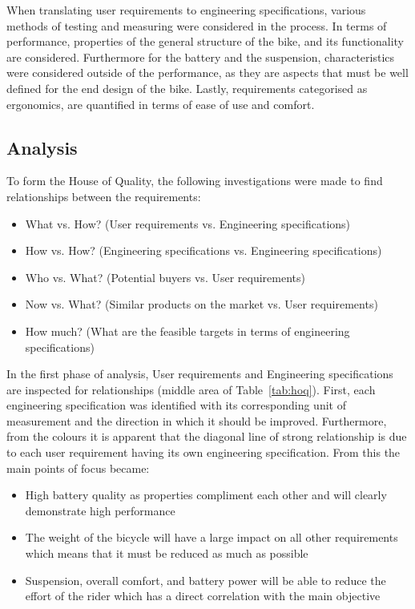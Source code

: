 \documentclass[a4paper,11pt]{article}
\begin{document}
When translating user requirements to engineering specifications, various methods of testing and measuring were considered in the process. In terms of performance, properties of the general structure of the bike, and its functionality are considered. Furthermore for the battery and the suspension, characteristics were considered outside of the performance, as they are aspects that must be well defined for the end design of the bike. Lastly, requirements categorised as ergonomics, are quantified in terms of ease of use and comfort.

\subsection{Analysis}

To form the House of Quality, the following investigations were made to find relationships between the requirements:
\begin{itemize}
	\setlength{\itemsep}{0pt}
	\item What vs. How? (User requirements vs. Engineering specifications)
	\item How vs. How? (Engineering specifications vs. Engineering specifications)
	\item Who vs. What? (Potential buyers vs. User requirements)
	\item Now vs. What? (Similar products on the market vs. User requirements)
	\item How much? (What are the feasible targets in terms of engineering specifications)
\end{itemize}

In the first phase of analysis, User requirements and Engineering specifications are inspected for relationships (middle area of Table~\ref{tab:hoq}). First, each engineering specification was identified with its corresponding unit of measurement and the direction in which it should be improved. Furthermore, from the colours it is apparent that the diagonal line of strong relationship is due to each user requirement having its own engineering specification. From this the main points of focus became:
\begin{itemize}
	\setlength{\itemsep}{0pt}
	\item High battery quality as properties compliment each other and will clearly demonstrate high performance
	\item The weight of the bicycle will have a large impact on all other requirements which means that it must be reduced as much as possible
	\item Suspension, overall comfort, and battery power will be able to reduce the effort of the rider which has a direct correlation with the main objective
\end{itemize}
\end{document}
